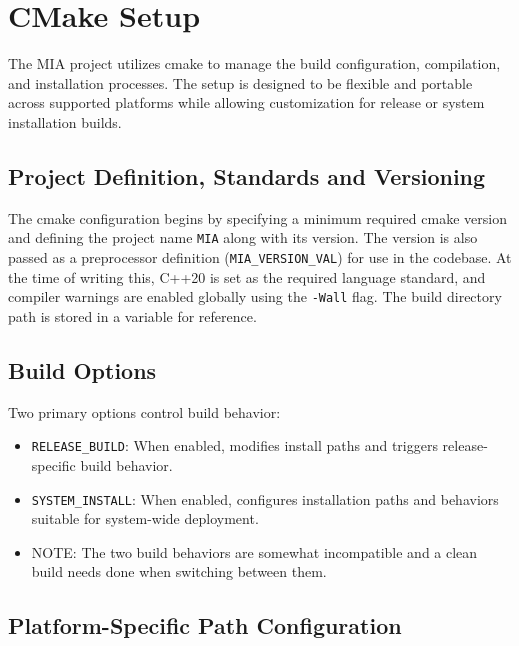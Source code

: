 \section{CMake Setup}
\label{section:cmake_setup}

The MIA project utilizes cmake to manage the build configuration, compilation, and installation processes. The setup is designed to be flexible and portable across supported platforms while allowing customization for release or system installation builds.

\subsection{Project Definition, Standards and Versioning}

The cmake configuration begins by specifying a minimum required cmake version and defining the project name \texttt{MIA} along with its version. The version is also passed as a preprocessor definition (\texttt{MIA\_VERSION\_VAL}) for use in the codebase. At the time of writing this, C++20 is set as the required language standard, and compiler warnings are enabled globally using the \texttt{-Wall} flag. The build directory path is stored in a variable for reference.

\subsection{Build Options}

Two primary options control build behavior:
\begin{itemize}\itemsep0em
	\item \texttt{RELEASE\_BUILD}: When enabled, modifies install paths and triggers release-specific build behavior.
	\item \texttt{SYSTEM\_INSTALL}: When enabled, configures installation paths and behaviors suitable for system-wide deployment.
	\item NOTE: The two build behaviors are somewhat incompatible and a clean build needs done when switching between them.
\end{itemize}

\subsection{Platform-Specific Path Configuration}

